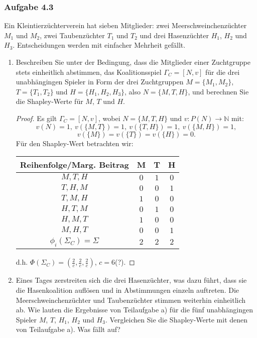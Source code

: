 \documentclass[12pt]{extreport} %
\newcommand{\N}{\mathbb{N}}
\theoremstyle{named}
\theoremstyle{itshape}
\theoremstyle{normal}
\begin{document}
\subsubsection*{Aufgabe 4.3}

Ein Kleintierzüchterverein hat sieben Mitglieder: zwei Meerschweinchenzüchter $M_1$ und $M_2$, zwei Taubenzüchter $T_1$ und $T_2$ und drei Hasenzüchter $H_1$, $H_2$ und $H_3$. Entscheidungen werden mit einfacher Mehrheit gefällt.

  \begin{enumerate}
 	\item Beschreiben Sie unter der Bedingung, dass die Mitglieder einer Zuchtgruppe stets einheitlich abstimmen, das Koalitionsspiel $\Gamma_C = [N, v]$ für die drei unabhängingen Spieler in Form der drei Zuchtgruppen $M = \{M_1,M_2\}$, $T = \{T_1, T_2\}$ und $H = \{H_1,H_2,H_3\}$, also $N = \{M, T, H\}$, und berechnen Sie die Shapley-Werte für $M$, $T$ und $H$.
 		\begin{proof}
 			Es gilt $\Gamma_C = [N, v]$, wobei $N = \{ M, T, H \}$ und $v \colon P(N) \rightarrow \N$ mit:
 			$$ v(N) = 1, ~ v(\{M, T\}) = 1, ~ v(\{T, H\}) = 1, ~ v(\{M,H\}) = 1,$$
 			$$  v(\{M\}) = v(\{T\}) = v(\{H\}) = 0. $$
			Für den Shapley-Wert betrachten wir:
  			\begin{center}
    			\begin{tabular}{| c | c | c | c |}
   					\hline
    					Reihenfolge/Marg. Beitrag & M & T & H \\ 
    						\hline
    					$M, T, H$ & $0$ & $1$ & $0$  \\ 
    						\hline
    					$T, H, M$ & $0$ & $0$ & $1$  \\
    						\hline
    					$T, M, H$ & $1$ & $0$ & $0$  \\
       						\hline
    					$H, T, M$ & $0$ & $1$ & $0$  \\
      						\hline
    					$H, M, T$ & $1$ & $0$ & $0$  \\
      						\hline
    					$M, H, T$ & $0$ & $0$ & $1$  \\
      						\hline \hline
    					$\phi_{i}(\Sigma_{C}) = \Sigma$  & $2$ & $2$ & $2$  \\
    				\hline
   				 \end{tabular}
    		\end{center}
    		d.h. $\Phi(\Sigma_{C}) = \left(\frac{2}{c}, \frac{2}{c}, \frac{2}{c} \right)$, $c = 6$(?).
 		\end{proof}
	\item Eines Tages zerstreiten sich die drei Hasenzüchter, was dazu führt, dass sie die Hasenkoalition auflösen und in Abstimmungen einzeln auftreten. Die Meerschweinchenzüchter und Taubenzüchter stimmen weiterhin einheitlich ab. Wie lauten die Ergebnisse von Teilaufgabe a) für die fünf unabhängingen Spieler $M$, $T$, $H_1$, $H_2$ und $H_3$. Vergleichen Sie die Shapley-Werte mit denen von Teilaufgabe a). Was fällt auf?

\end{enumerate}
\end{document}
